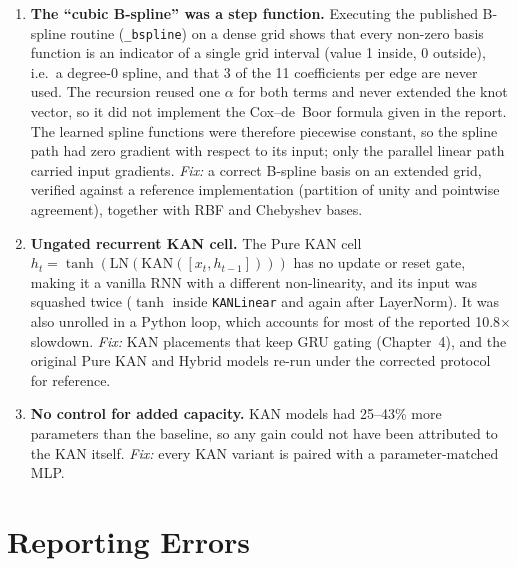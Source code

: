 \documentclass[12pt,a4paper]{report}
\begin{document}
\begin{enumerate}[leftmargin=*]
  \item \textbf{The ``cubic B-spline'' was a step function.}
        Executing the published B-spline routine (\texttt{\_bspline}) on a dense grid
        shows that every non-zero basis function is an indicator of a single
        grid interval (value 1 inside, 0 outside), i.e.\ a degree-0 spline, and
        that 3 of the 11 coefficients per edge are never used. The recursion
        reused one $\alpha$ for both terms and never extended the knot vector, so
        it did not implement the Cox--de~Boor formula given in the report.
        The learned spline functions were therefore piecewise constant, so the
        spline path had zero gradient with respect to its input; only the
        parallel linear path carried input gradients.
        \emph{Fix:} a correct B-spline basis on an extended grid, verified
        against a reference implementation (partition of unity and pointwise
        agreement), together with RBF and Chebyshev bases.

  \item \textbf{Ungated recurrent KAN cell.}
        The Pure KAN cell $h_t=\tanh(\mathrm{LN}(\mathrm{KAN}([x_t,h_{t-1}])))$
        has no update or reset gate, making it a vanilla RNN with a different
        non-linearity, and its input was squashed twice ($\tanh$ inside
        \texttt{KANLinear} and again after LayerNorm). It was also unrolled in a
        Python loop, which accounts for most of the reported 10.8$\times$
        slowdown.
        \emph{Fix:} KAN placements that keep GRU gating (Chapter~4), and the
        original Pure KAN and Hybrid models re-run under the corrected protocol
        for reference.

  \item \textbf{No control for added capacity.}
        KAN models had 25--43\% more parameters than the baseline, so any gain
        could not have been attributed to the KAN itself.
        \emph{Fix:} every KAN variant is paired with a parameter-matched MLP.
\end{enumerate}

\section{Reporting Errors}
\end{document}
